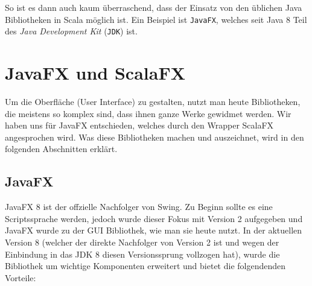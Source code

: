 So ist es dann auch kaum überraschend, dass der Einsatz von den üblichen Java Bibliotheken in Scala möglich ist. Ein Beispiel ist \texttt{JavaFX}, welches seit Java 8 Teil des \textit{Java Development Kit} (\texttt{JDK}) ist.

\section{JavaFX und ScalaFX}
Um die Oberfläche (User Interface) zu gestalten, nutzt man heute Bibliotheken, die meistens so komplex sind, dass ihnen ganze Werke gewidmet werden. Wir haben uns für JavaFX entschieden, welches durch den Wrapper ScalaFX angesprochen wird. Was diese Bibliotheken machen und auszeichnet, wird in den folgenden Abschnitten erklärt.

\subsection{JavaFX}
JavaFX 8 ist der offzielle Nachfolger von Swing. Zu Beginn sollte es eine Scriptssprache werden, jedoch wurde dieser Fokus mit Version 2 aufgegeben und JavaFX wurde zu der GUI Bibliothek, wie man sie heute nutzt. In der aktuellen Version 8 (welcher der direkte Nachfolger von Version 2 ist und wegen der Einbindung in das JDK 8 diesen Versionssprung vollzogen hat), wurde die Bibliothek um wichtige Komponenten erweitert und bietet die folgendenden Vorteile:

